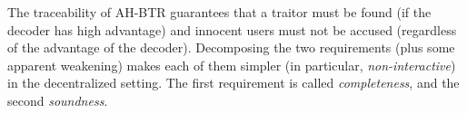 The traceability of AH-BTR guarantees that a traitor must be found (if the decoder has high advantage) and innocent users must not be accused (regardless of the advantage of the decoder).
Decomposing the two requirements (plus some apparent weakening) makes each of them simpler (in particular, \emph{non-interactive}) in the decentralized setting.
The first requirement is called \emph{completeness}, and the second \emph{soundness}.
